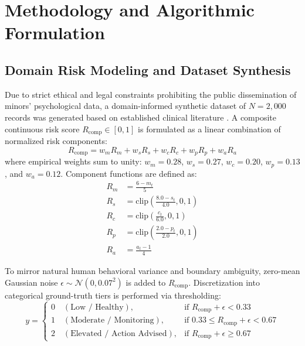 \documentclass[conference]{IEEEtran}
\begin{document}
\section{Methodology and Algorithmic Formulation}
\label{sec:methodology}

\subsection{Domain Risk Modeling and Dataset Synthesis}
Due to strict ethical and legal constraints prohibiting the public dissemination of minors' psychological data, a domain-informed synthetic dataset of $N = 2,000$ records was generated based on established clinical literature \cite{who2022mental, bitsko2022mental}. A composite continuous risk score $R_{\text{comp}} \in [0, 1]$ is formulated as a linear combination of normalized risk components:
\begin{equation}
R_{\text{comp}} = w_m R_m + w_s R_s + w_c R_c + w_p R_p + w_a R_a
\label{eq:composite_risk}
\end{equation}
where empirical weights sum to unity: $w_m = 0.28$, $w_s = 0.27$, $w_c = 0.20$, $w_p = 0.13$, and $w_a = 0.12$. Component functions are defined as:
\begin{align}
R_m &= \frac{6 - m_t}{5} \\
R_s &= \text{clip}\left(\frac{8.0 - s_t}{4.0}, 0, 1\right) \\
R_c &= \text{clip}\left(\frac{c_t}{6.0}, 0, 1\right) \\
R_p &= \text{clip}\left(\frac{2.0 - p_t}{2.0}, 0, 1\right) \\
R_a &= \frac{a_t - 1}{4}
\end{align}

To mirror natural human behavioral variance and boundary ambiguity, zero-mean Gaussian noise $\epsilon \sim \mathcal{N}(0, 0.07^2)$ is added to $R_{\text{comp}}$. Discretization into categorical ground-truth tiers is performed via thresholding:
\begin{equation}
y = \begin{cases}
0 \quad (\text{Low / Healthy}), & \text{if } R_{\text{comp}} + \epsilon < 0.33 \\
1 \quad (\text{Moderate / Monitoring}), & \text{if } 0.33 \le R_{\text{comp}} + \epsilon < 0.67 \\
2 \quad (\text{Elevated / Action Advised}), & \text{if } R_{\text{comp}} + \epsilon \ge 0.67
\end{cases}
\end{equation}
\end{document}
